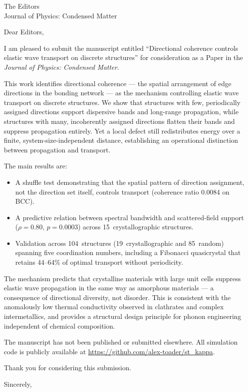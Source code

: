 \documentclass[12pt]{letter}
\begin{document}
\begin{letter}{The Editors\\Journal of Physics: Condensed Matter}

\opening{Dear Editors,}

I am pleased to submit the manuscript entitled ``Directional coherence
controls elastic wave transport on discrete structures'' for consideration
as a Paper in the \emph{Journal of Physics: Condensed Matter}.

This work identifies directional coherence --- the spatial arrangement of
edge directions in the bonding network --- as the mechanism controlling
elastic wave transport on discrete structures.  We show that structures with
few, periodically assigned directions support dispersive bands and
long-range propagation, while structures with many, incoherently assigned
directions flatten their bands and suppress propagation entirely.  Yet a
local defect still redistributes energy over a finite,
system-size-independent distance, establishing an operational distinction
between propagation and transport.

The main results are:
\begin{itemize}
\item A shuffle test demonstrating that the spatial pattern of direction
  assignment, not the direction set itself, controls transport (coherence
  ratio 0.0084 on BCC).
\item A predictive relation between spectral bandwidth and scattered-field
  support ($\rho = 0.80$, $p = 0.0003$) across 15~crystallographic
  structures.
\item Validation across 104~structures (19~crystallographic and 85~random)
  spanning five coordination numbers, including a Fibonacci quasicrystal
  that retains 44--64\% of optimal transport without periodicity.
\end{itemize}

The mechanism predicts that crystalline materials with large unit cells
suppress elastic wave propagation in the same way as amorphous materials ---
a consequence of directional diversity, not disorder.  This is consistent
with the anomalously low thermal conductivity observed in clathrates and
complex intermetallics, and provides a structural design principle for
phonon engineering independent of chemical composition.

The manuscript has not been published or submitted elsewhere.  All
simulation code is publicly available at
\url{https://github.com/alex-toader/st_kappa}.

Thank you for considering this submission.

\closing{Sincerely,}

\end{letter}
\end{document}
